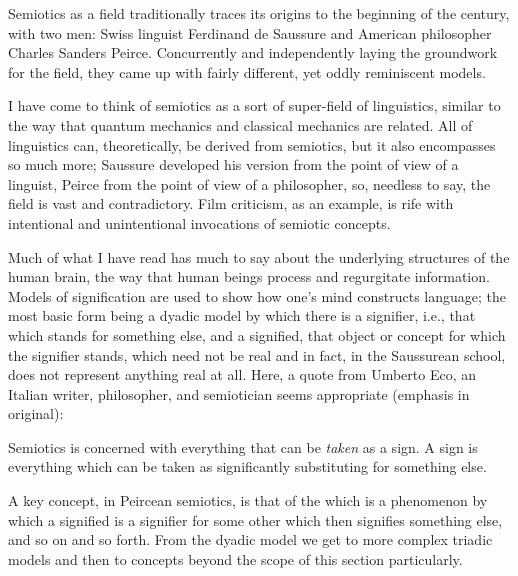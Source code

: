 \documentclass[../butidigress.tex]{subfiles}
\begin{document}
Semiotics as a field traditionally traces its origins to the beginning of the  century, with two men: Swiss linguist Ferdinand de Saussure and American philosopher Charles Sanders Peirce\autocite[2]{semioticsthebasics}.
Concurrently and independently laying the groundwork for the field, they came up with fairly different, yet oddly reminiscent models.

I have come to think of semiotics as a sort of super-field of linguistics, similar to the way that quantum mechanics and classical mechanics are related.
All of linguistics can, theoretically, be derived from semiotics, but it also encompasses so much more; Saussure developed his version from the point of view of a linguist, Peirce from the point of view of a philosopher, so, needless to say, the field is vast and contradictory.
Film criticism, as an example, is rife with intentional and unintentional invocations of semiotic concepts.

Much of what I have read has much to say about the underlying structures of the human brain, the way that human beings process and regurgitate information.
Models of signification are used to show how one's mind constructs language; the most basic form being a dyadic model by which there is a signifier, i.e., that which stands for something else, and a signified, that object or concept for which the signifier stands, which need not be real and in fact, in the Saussurean school, does not represent anything real at all.
Here, a quote from Umberto Eco, an Italian writer, philosopher, and semiotician seems appropriate (emphasis in original):
\begin{displayquote}
Semiotics is concerned with everything that can be \emph{taken} as a sign.
A sign is everything which can be taken as significantly substituting for something else.\autocite{ecosemiotics}
\end{displayquote}

A key concept, in Peircean semiotics, is that of the  which is a phenomenon by which a signified is a signifier for some other  which then signifies something else, and so on and so forth.
From the dyadic model we get to more complex triadic models and then to concepts beyond the scope of this section particularly.
\end{document}
